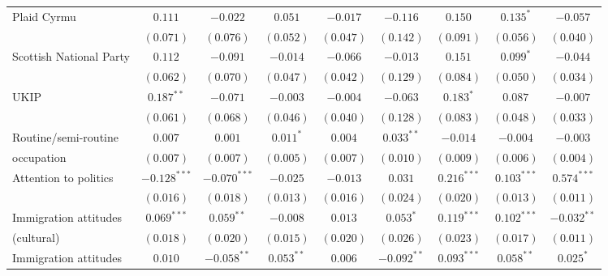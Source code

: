 \documentclass[12pt, letter]{article}
\begin{document}
\begin{table}[H]
\begin{center}
{\begin{tabular}{l c c c c c c c c }
Plaid Cyrmu                      & $0.111$        & $-0.022$       & $0.051$        & $-0.017$       & $-0.116$       & $0.150$        & $0.135^{*}$    & $-0.057$       \\
                                 & $(0.071)$      & $(0.076)$      & $(0.052)$      & $(0.047)$      & $(0.142)$      & $(0.091)$      & $(0.056)$      & $(0.040)$      \\
Scottish National Party          & $0.112$        & $-0.091$       & $-0.014$       & $-0.066$       & $-0.013$       & $0.151$        & $0.099^{*}$    & $-0.044$       \\
                                 & $(0.062)$      & $(0.070)$      & $(0.047)$      & $(0.042)$      & $(0.129)$      & $(0.084)$      & $(0.050)$      & $(0.034)$      \\
UKIP                             & $0.187^{**}$   & $-0.071$       & $-0.003$       & $-0.004$       & $-0.063$       & $0.183^{*}$    & $0.087$        & $-0.007$       \\
                                 & $(0.061)$      & $(0.068)$      & $(0.046)$      & $(0.040)$      & $(0.128)$      & $(0.083)$      & $(0.048)$      & $(0.033)$      \\
Routine/semi-routine   & $0.007$        & $0.001$        & $0.011^{*}$    & $0.004$        & $0.033^{**}$   & $-0.014$       & $-0.004$       & $-0.003$       \\
 occupation                                & $(0.007)$      & $(0.007)$      & $(0.005)$      & $(0.007)$      & $(0.010)$      & $(0.009)$      & $(0.006)$      & $(0.004)$      \\
Attention to politics            & $-0.128^{***}$ & $-0.070^{***}$ & $-0.025$       & $-0.013$       & $0.031$        & $0.216^{***}$  & $0.103^{***}$  & $0.574^{***}$  \\
                                 & $(0.016)$      & $(0.018)$      & $(0.013)$      & $(0.016)$      & $(0.024)$      & $(0.020)$      & $(0.013)$      & $(0.011)$      \\
Immigration attitudes  & $0.069^{***}$  & $0.059^{**}$   & $-0.008$       & $0.013$        & $0.053^{*}$    & $0.119^{***}$  & $0.102^{***}$  & $-0.032^{**}$  \\
   (cultural)                              & $(0.018)$      & $(0.020)$      & $(0.015)$      & $(0.020)$      & $(0.026)$      & $(0.023)$      & $(0.017)$      & $(0.011)$      \\
Immigration attitudes  & $0.010$        & $-0.058^{**}$  & $0.053^{**}$   & $0.006$        & $-0.092^{**}$  & $0.093^{***}$  & $0.058^{**}$   & $0.025^{*}$    \\

\end{tabular}}
\end{center}
\end{table}
\end{document}
